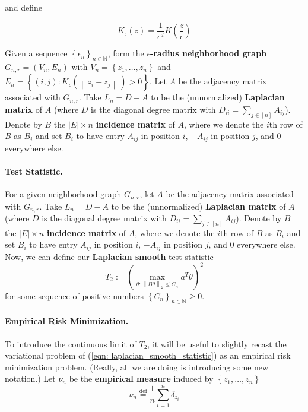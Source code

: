 \documentclass{article}
\newcommand{\norm}[1]{\left\lVert#1\right\rVert}
\newcommand{\abs}[1]{\left \lvert #1 \right \rvert}
\newcommand{\defeq}{\overset{\mathrm{def}}{=}}
\newcommand{\set}[1]{\left\{#1\right\}}
\newcommand{\seq}[1]{\set{#1}_{n \in \N}}
\newcommand{\N}{\mathbb{N}}
\theoremstyle{alden}
\theoremstyle{aldenthm}
\theoremstyle{remark}
\begin{document}
and define 

\begin{equation*}
K_{\epsilon}(z) = \frac{1}{\epsilon^d} K\left(\frac{z}{\epsilon}\right)
\end{equation*}


Given a sequence $\seq{\epsilon_n}$, form the \textbf{$\epsilon$-radius neighborhood graph} $G_{n,r} = (V_n,E_n)$ with $V_n = \set{z_1, \ldots, z_n}$ and $E_n = \set{(i,j): K_{\epsilon}(\norm{z_i - z_j}) > 0}$. Let $A$ be the adjacency matrix associated with $G_{n,r}$. Take $L_n = D - A$ to be the (unnormalized) \textbf{Laplacian matrix} of $A$ (where $D$ is the diagonal degree matrix with $D_{ii} = \sum_{j \in [n]} A_{ij}$). Denote by $B$ the $\abs{E} \times n$ \textbf{incidence matrix} of $A$, where we denote the $i$th row of $B$ as $B_i$ and set $B_i$ to have entry $A_{ij}$ in position $i$, $-A_{ij}$ in position $j$, and $0$ everywhere else. 

\paragraph{Test Statistic.}
For a given neighborhood graph $G_{n,r}$, let $A$ be the adjacency matrix associated with $G_{n,r}$. Take $L_n = D - A$ to be the (unnormalized) \textbf{Laplacian matrix} of $A$ (where $D$ is the diagonal degree matrix with $D_{ii} = \sum_{j \in [n]} A_{ij}$). Denote by $B$ the $\abs{E} \times n$ \textbf{incidence matrix} of $A$, where we denote the $i$th row of $B$ as $B_i$ and set $B_i$ to have entry $A_{ij}$ in position $i$, $-A_{ij}$ in position $j$, and $0$ everywhere else. 
Now, we can define our \textbf{Laplacian smooth} test statistic
\begin{equation}
\label{eqn: laplacian_smooth_statistic}
T_2 := \left(\max_{\theta: \norm{B\theta}_2 \leq C_n} a^T \theta \right)^2
\end{equation}
for some sequence of positive numbers $\seq{C_n} \geq 0$.


\paragraph{Empirical Risk Minimization.}
To introduce the continuous limit of $T_2$, it will be useful to slightly recast the variational problem of (\ref{eqn: laplacian_smooth_statistic}) as an empirical risk minimization problem. (Really, all we are doing is introducing some new notation.) Let $\nu_n$ be the \textbf{empirical measure} induced by $\set{z_1, \ldots, z_n}$
\begin{equation*}
\nu_n \defeq \frac{1}{n} \sum_{i = 1}^{n} \delta_{z_i}
\end{equation*}
\end{document}
